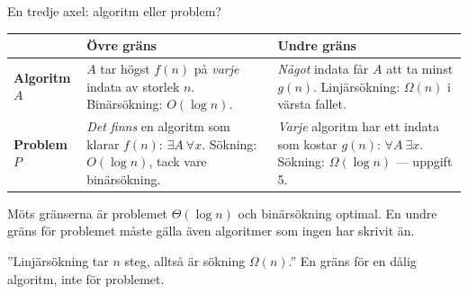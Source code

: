\begin{frame}{En tredje axel: algoritm eller problem?}
\footnotesize
\renewcommand{\arraystretch}{1.15}
\begin{tabularx}{\textwidth}{@{}p{}XX@{}}
\toprule
& \textbf{Övre gräns} & \textbf{Undre gräns}\\
\midrule
\textbf{Algoritm $A$} & $A$ tar högst $f(n)$ på \emph{varje} indata av storlek $n$.\newline
  \textcolor{black!60}{Binärsökning: $O(\log n)$.} &
  \emph{Något} indata får $A$ att ta minst $g(n)$.\newline
  \textcolor{black!60}{Linjärsökning: $\Omega(n)$ i värsta fallet.}\\
\textbf{Problem $P$} & \emph{Det finns} en algoritm som klarar $f(n)$: $\exists A\ \forall x$.\newline
  \textcolor{black!60}{Sökning: $O(\log n)$, tack vare binärsökning.} &
  \emph{Varje} algoritm har ett indata som kostar $g(n)$: $\forall A\ \exists x$.\newline
  \textcolor{black!60}{Sökning: $\Omega(\log n)$ — uppgift 5.}\\
\bottomrule
\end{tabularx}
\medskip

\small
Möts gränserna är problemet $\Theta(\log n)$ och binärsökning optimal. En undre gräns för
problemet måste gälla även algoritmer som ingen har skrivit än.
\vfill
\begin{missbox}
”Linjärsökning tar $n$ steg, alltså är sökning $\Omega(n)$.” En gräns för en dålig
algoritm, inte för problemet.
\end{missbox}
\end{frame}

